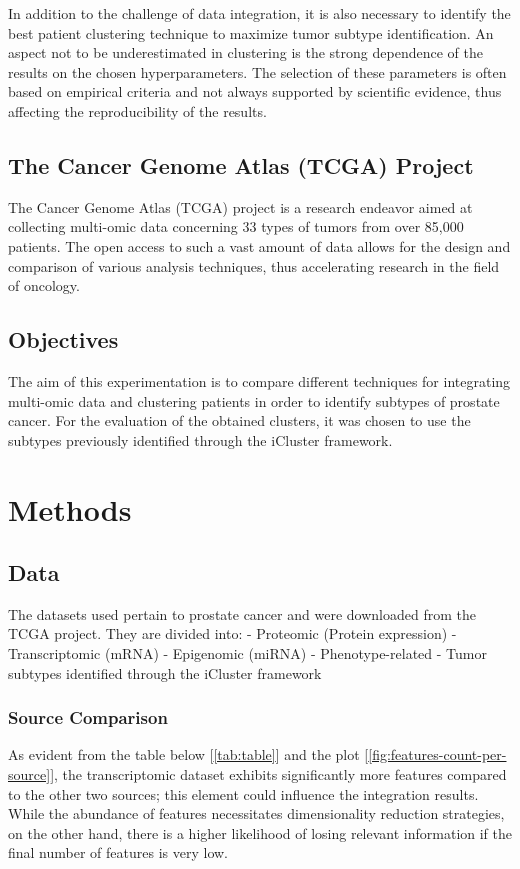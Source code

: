 \documentclass[12pt,a4paper]{article}
\begin{document}
In addition to the challenge of data integration, it is also necessary to identify the best patient clustering technique to maximize tumor subtype identification. An aspect not to be underestimated in clustering is the strong dependence of the results on the chosen hyperparameters. The selection of these parameters is often based on empirical criteria and not always supported by scientific evidence, thus affecting the reproducibility of the results.

\subsection{The Cancer Genome Atlas (TCGA) Project}
The Cancer Genome Atlas (TCGA) project is a research endeavor aimed at collecting multi-omic data concerning 33 types of tumors from over 85,000 patients. The open access to such a vast amount of data allows for the design and comparison of various analysis techniques, thus accelerating research in the field of oncology.

\subsection{Objectives}
The aim of this experimentation is to compare different techniques for integrating multi-omic data and clustering patients in order to identify subtypes of prostate cancer. For the evaluation of the obtained clusters, it was chosen to use the subtypes previously identified through the iCluster framework.

\pagebreak
\section{Methods}
\subsection{Data}
The datasets used pertain to prostate cancer and were downloaded from the TCGA project. They are divided into:
- Proteomic (Protein expression)
- Transcriptomic (mRNA)
- Epigenomic (miRNA)
- Phenotype-related
- Tumor subtypes identified through the iCluster framework

\subsubsection{Source Comparison}
As evident from the table below [\ref{tab:table}] and the plot [\ref{fig:features-count-per-source}], the transcriptomic dataset exhibits significantly more features compared to the other two sources; this element could influence the integration results. While the abundance of features necessitates dimensionality reduction strategies, on the other hand, there is a higher likelihood of losing relevant information if the final number of features is very low.
\end{document}
